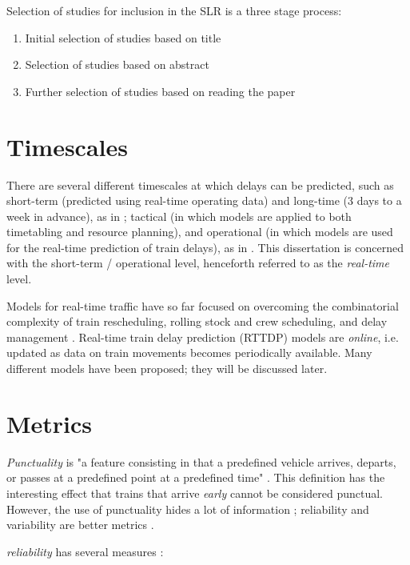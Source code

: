 \documentclass{article}
\begin{document}
Selection of studies for inclusion in the SLR is a three stage process:

\begin{enumerate}
	\item Initial selection of studies based on title
	\item Selection of studies based on abstract
	\item Further selection of studies based on reading the paper

\end{enumerate}

\section{Timescales}

There are several different timescales at which delays can be predicted, such as short-term (predicted using real-time operating data) and long-time (3 days to a week in advance), as in \cite{wang_zhang_2019};
tactical (in which models are applied to both timetabling and resource planning), and operational (in which models are used for the real-time prediction of train delays), as in \cite{markovic_milinkovic_tikhonov_schonfeld_2015}. This dissertation is concerned with the short-term / operational level, henceforth referred to as the \textit{real-time} level. 

Models for real-time traffic have so far focused on overcoming the combinatorial complexity of train rescheduling, rolling stock and crew scheduling, and delay management \cite{kecman_corman_meng_2015}.
Real-time train delay prediction (RTTDP) models are \textit{online}, i.e. updated as data on train movements becomes periodically available.  Many different models have been proposed; they will be discussed later.

\section{Metrics}

\textit{Punctuality} is "a feature consisting in that a predefined vehicle arrives, departs, or passes at a predefined point at a predefined time" \cite{rudnicki_1997}. This definition has the interesting effect that trains 
that arrive \textit{early} cannot be considered punctual. However, the use of punctuality hides a lot of information \cite{skagestad_2004}; reliability and variability are better metrics \cite{olsson_haugland_2004}.

\textit{reliability} has several measures \cite{rietveld_bruinsma_van_vuuren_2001}:
\end{document}
